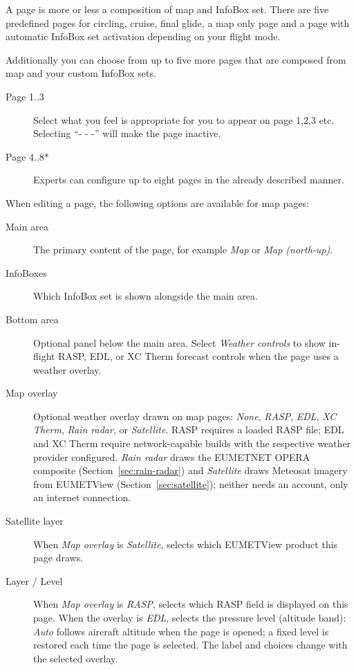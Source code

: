 A page is more or less a composition of map and InfoBox set. There are five 
predefined pages for circling, cruise, final glide, a map only page and a 
page with automatic InfoBox set activation depending on your flight mode.

Additionally you can choose from up to five more pages that are composed from map 
and your custom InfoBox sets.  

\begin{description}
\item[Page 1..3]  Select what you feel is appropriate for you to appear on page 1,2,3 etc. 
  Selecting ``- - -'' will make the page inactive.
\item[Page 4..8*]  Experts can configure up to eight pages in the already 
  described manner.
\end{description}

When editing a page, the following options are available for map pages:
\begin{description}
\item[Main area]  The primary content of the page, for example \emph{Map}
  or \emph{Map (north-up)}.
\item[InfoBoxes]  Which InfoBox set is shown alongside the main area.
\item[Bottom area]  Optional panel below the main area.  Select
  \emph{Weather controls} to show in-flight RASP, EDL, or XC Therm forecast
  controls when the page uses a weather overlay.
\item[Map overlay]  Optional weather overlay drawn on map pages: \emph{None},
  \emph{RASP}, \emph{EDL}, \emph{XC Therm}, \emph{Rain radar}, or
  \emph{Satellite}.  RASP requires a loaded RASP file; EDL and XC Therm
  require network-capable builds with the respective weather provider
  configured.  \emph{Rain radar} draws the EUMETNET OPERA composite
  (Section~\ref{sec:rain-radar}) and \emph{Satellite} draws Meteosat
  imagery from EUMETView (Section~\ref{sec:satellite}); neither needs an
  account, only an internet connection.
\item[Satellite layer]  When \emph{Map overlay} is \emph{Satellite},
  selects which EUMETView product this page draws.
\item[Layer / Level]  When \emph{Map overlay} is \emph{RASP}, selects
  which RASP field is displayed on this page.  When the overlay is
  \emph{EDL}, selects the pressure level (altitude band): \emph{Auto}
  follows aircraft altitude when the page is opened; a fixed level is
  restored each time the page is selected.  The label and choices
  change with the selected overlay.
\end{description}


